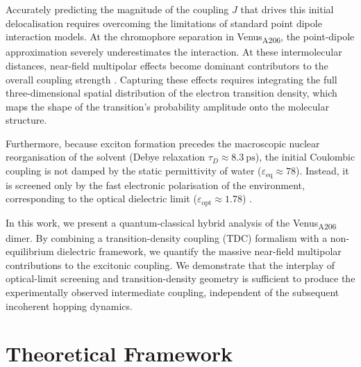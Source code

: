 \documentclass[journal=jpclcd, manuscript=letter, layout=twocolumn, doi=true]{achemso}
\begin{document}
Accurately predicting the magnitude of the coupling $J$ that drives this initial delocalisation requires overcoming the limitations of standard point dipole interaction models. At the chromophore separation in Venus\textsubscript{A206}, the point-dipole approximation severely underestimates the interaction. At these intermolecular distances, near-field multipolar effects become dominant contributors to the overall coupling strength \cite{scholes2003, kitohnishioka2017forster}. Capturing these effects requires integrating the full three-dimensional spatial distribution of the electron transition density, which maps the shape of the transition's probability amplitude onto the molecular structure. 

Furthermore, because exciton formation precedes the macroscopic nuclear reorganisation of the solvent (Debye relaxation $\tau_D \approx 8.3~\mathrm{ps}$), the initial Coulombic coupling is not damped by the static permittivity of water ($\varepsilon_{\mathrm{eq}} \approx 78$). Instead, it is screened only by the fast electronic polarisation of the environment, corresponding to the optical dielectric limit ($\varepsilon_{\mathrm{opt}} \approx 1.78$) \cite{mennucci2012, scholes2003}.

In this work, we present a quantum-classical hybrid analysis of the Venus\textsubscript{A206} dimer. By combining a transition-density coupling (TDC) formalism with a non-equilibrium dielectric framework, we quantify the massive near-field multipolar contributions to the excitonic coupling. We demonstrate that the interplay of optical-limit screening and transition-density geometry is sufficient to produce the experimentally observed intermediate coupling, independent of the subsequent incoherent hopping dynamics.

\section{Theoretical Framework}
\end{document}
